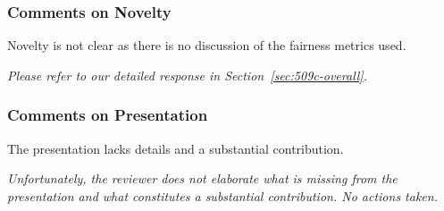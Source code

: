 \documentclass[conference,review,anonymous]{IEEEtran}
\newcommand{\highlight}[1]{\begin{framed}%
  \noindent\emph{#1}
\end{framed}}
\begin{document}
\subsubsection{Comments on Novelty}
Novelty is not clear as there is no discussion of the fairness metrics
used.

\highlight{Please refer to our detailed response in
Section~\ref{sec:509c-overall}.}

\subsubsection{Comments on Presentation}
The presentation lacks details and a substantial contribution.

\highlight{Unfortunately, the reviewer does not elaborate what is
missing from the presentation and what constitutes a substantial
contribution. No actions taken.}
\end{document}

